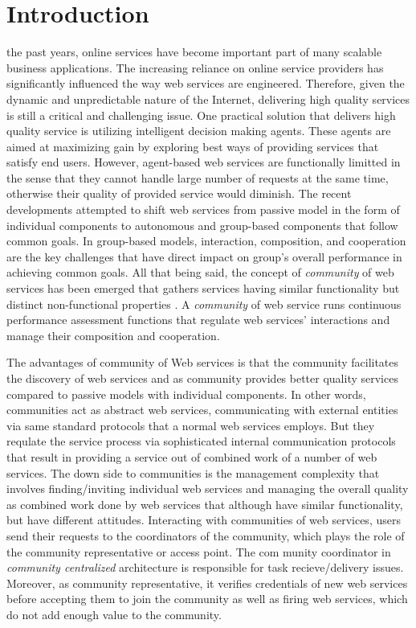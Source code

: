 \documentclass[10pt,journal,cspaper,compsoc]{IEEEtran}
\begin{document}
\section{Introduction}

 the past years, online services have become important part of many scalable business applications. The increasing reliance on online service providers has significantly influenced the way web services are engineered. Therefore, given the dynamic and unpredictable nature of the Internet, delivering high quality services is still a critical and challenging issue. One practical solution that delivers high quality service is utilizing intelligent decision making agents. These agents are aimed at maximizing gain by exploring best ways of providing services that satisfy end users. However, agent-based web services are functionally limitted in the sense that they cannot handle large number of requests at the same time, otherwise their quality of provided service would diminish. The recent developments attempted to shift web services from passive model in the form of individual components to autonomous and group-based components that follow common goals. In group-based models, interaction, composition, and cooperation are the key challenges \cite{ICWS2011-1, SCC2011-1, journals/mags/BaldoniBM10, journals/jcss/CasadoYT13} that have direct impact on group's overall performance in achieving common goals. All that being said, the concept of \emph{community} of web services has been emerged that gathers services having similar functionality but distinct non-functional properties \cite{Zeng:2003:QDW:775152.775211, Paik:2005:TSS:2229263.2230038, Medjahed05adynamic, 10.1109/ARES.2008.7}. A \emph{community} of web service runs continuous performance assessment functions that regulate web services' interactions and manage their composition and cooperation.

The advantages of community of Web services is that the community facilitates the discovery of web services and as community provides better quality services compared to passive models with individual components. In other words, communities act as abstract web services, communicating with external entities via same standard protocols that a normal web services employs. But they requlate the service process via sophisticated internal communication protocols that result in providing a service out of combined work of a number of web services. The down side to communities is the management complexity that involves finding/inviting individual web services and managing the overall quality as combined work done by web services that although have similar functionality, but have different attitudes. Interacting with communities of web services, users send their requests to the coordinators of the community, which plays the role of the community representative or access point. The com munity coordinator in \emph{community centralized} architecture is responsible for task recieve/delivery issues. Moreover, as community representative, it verifies credentials of new web services before accepting them to join the community as well as firing web services, which do not add enough value to the community.  
\end{document}
